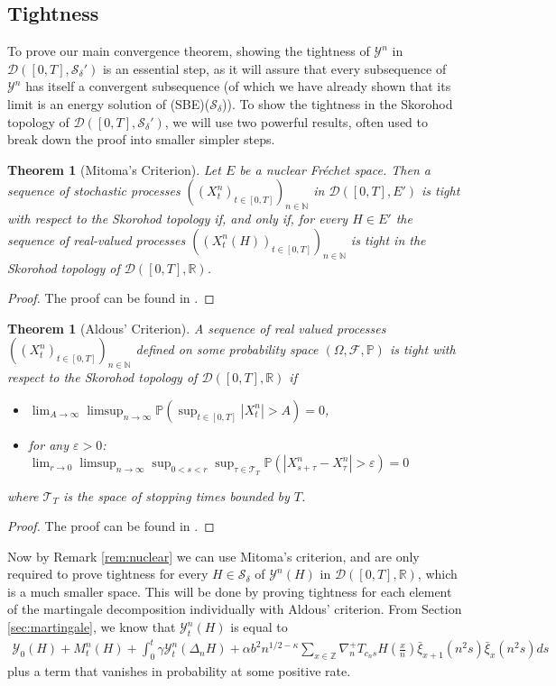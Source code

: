 \documentclass[a4paper, reqno, 12pt]{amsart}
\theoremstyle{plain}
\newtheorem{theorem}[definition]{Theorem}
\theoremstyle{definition}
\newcommand{\R}{\mathbb{R}}
\newcommand{\Z}{\mathbb{Z}}
\newcommand{\N}{\mathbb{N}}
\begin{document}
\subsection{Tightness}
\label{sec:tightness}
To prove our main convergence theorem, showing the tightness of $\mathcal{Y}^n$ in $\mathcal{D}([0,T],\mathcal{S}_{\delta}')$ is an essential step, as it will assure that every subsequence of $\mathcal{Y}^n$ has itself a convergent subsequence (of which we have already shown that its limit is an energy solution of (SBE)($\mathcal S_{\delta}$)).
To show the tightness in the Skorohod topology of $\mathcal{D}([0,T],\mathcal{S}_{\delta}')$, we will use two powerful results, often used to break down the proof into smaller simpler steps.
\begin{theorem}[Mitoma's Criterion]
    Let $E$ be a nuclear Fréchet space. Then a sequence of stochastic processes $((X^n_t)_{t\in[0,T]})_{n\in\N}$ in $\mathcal{D}([0,T],E')$ is tight with respect to the Skorohod topology if, and only if, for every $H\in E'$ the sequence of real-valued processes  $((X^n_t(H))_{t\in[0,T]})_{n\in\N}$ is tight in the Skorohod topology of $\mathcal{D}([0,T],\R)$.
\end{theorem}
\begin{proof}
    The proof can be found in \cite{M83}.
\end{proof}

\begin{theorem}[Aldous' Criterion]
    A sequence of real valued processes $((X^n_t)_{t\in[0,T]})_{n\in\N}$ defined on some probability space $(\Omega,\mathcal{F},\mathbb{P})$ is tight with respect to the Skorohod topology of $\mathcal{D}([0,T],\R)$ if
    \begin{itemize}
        \item[(i)] $\lim_{A\to \infty} \limsup_{n\to\infty} \mathbb{P}(\sup_{t\in[0,T]} |X^n_t|>A) = 0$,
        \item[(ii)] for any $\varepsilon>0$: $\lim_{r\to 0} \limsup_{n\to\infty} \sup_{0<s<r} \sup_{\tau\in\mathcal{T}_T} \mathbb{P}(|X^n_{s +\tau} -X^n_{\tau}| > \varepsilon) = 0$
    \end{itemize}
    where $\mathcal{T}_T$ is the space of stopping times bounded by $T$.
\end{theorem}
\begin{proof}
    The proof can be found in \cite[Proposition 4.1.6]{KL99}.
\end{proof}
Now by Remark \ref{rem:nuclear} we can use Mitoma's criterion, and are only required to prove tightness for every $H\in\mathcal S_{\delta}$ of $\mathcal{Y}^n(H)$ in $\mathcal{D}([0,T],\R)$, which is a much smaller space.
This will be done by proving tightness for each element of the martingale decomposition individually with Aldous' criterion. 
From Section \ref{sec:martingale}, we know that $\mathcal{Y}^n_t(H)$ is equal to 
\begin{align}\label{eq:dynkintight}
     \mathcal{Y}_0(H) + M^n_t(H) + \int_0^t \gamma\mathcal{Y}^n_t(\Delta_nH) + \alpha b^2 n^{1/2-\kappa}\sum_{x\in\Z} \nabla^+_n T_{c_ns}H\left(\frac{x}{n}\right)\bar\xi_{x+1}(n^2s)\bar\xi_x(n^2s) ds 
\end{align}
plus a term that vanishes in probability at some positive rate.
\end{document}
